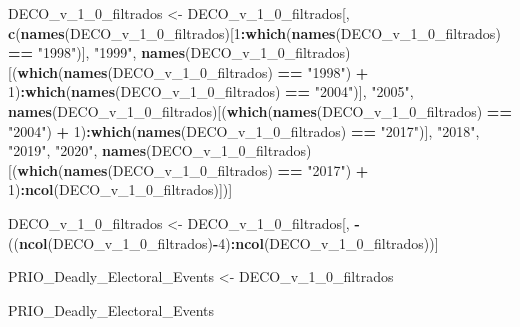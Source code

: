\documentclass[
  11pt,
]{article}
\newenvironment{Shaded}{\begin{snugshade}}{\end{snugshade}}
\newcommand{\DecValTok}[1]{\textcolor[rgb]{0.00,0.00,0.81}{#1}}
\newcommand{\FunctionTok}[1]{\textcolor[rgb]{0.13,0.29,0.53}{\textbf{#1}}}
\newcommand{\NormalTok}[1]{#1}
\newcommand{\OtherTok}[1]{\textcolor[rgb]{0.56,0.35,0.01}{#1}}
\newcommand{\SpecialCharTok}[1]{\textcolor[rgb]{0.81,0.36,0.00}{\textbf{#1}}}
\newcommand{\StringTok}[1]{\textcolor[rgb]{0.31,0.60,0.02}{#1}}
\begin{document}
\begin{Shaded}
\begin{Highlighting}[]
\NormalTok{DECO\_v\_1\_0\_filtrados }\OtherTok{\textless{}{-}}\NormalTok{ DECO\_v\_1\_0\_filtrados[, }\FunctionTok{c}\NormalTok{(}\FunctionTok{names}\NormalTok{(DECO\_v\_1\_0\_filtrados)[}\DecValTok{1}\SpecialCharTok{:}\FunctionTok{which}\NormalTok{(}\FunctionTok{names}\NormalTok{(DECO\_v\_1\_0\_filtrados) }\SpecialCharTok{==} \StringTok{"1998"}\NormalTok{)], }
                                                 \StringTok{"1999"}\NormalTok{, }
                                                 \FunctionTok{names}\NormalTok{(DECO\_v\_1\_0\_filtrados)[(}\FunctionTok{which}\NormalTok{(}\FunctionTok{names}\NormalTok{(DECO\_v\_1\_0\_filtrados) }\SpecialCharTok{==} \StringTok{"1998"}\NormalTok{) }\SpecialCharTok{+} \DecValTok{1}\NormalTok{)}\SpecialCharTok{:}\FunctionTok{which}\NormalTok{(}\FunctionTok{names}\NormalTok{(DECO\_v\_1\_0\_filtrados) }\SpecialCharTok{==} \StringTok{"2004"}\NormalTok{)], }
                                                 \StringTok{"2005"}\NormalTok{, }
                                                 \FunctionTok{names}\NormalTok{(DECO\_v\_1\_0\_filtrados)[(}\FunctionTok{which}\NormalTok{(}\FunctionTok{names}\NormalTok{(DECO\_v\_1\_0\_filtrados) }\SpecialCharTok{==} \StringTok{"2004"}\NormalTok{) }\SpecialCharTok{+} \DecValTok{1}\NormalTok{)}\SpecialCharTok{:}\FunctionTok{which}\NormalTok{(}\FunctionTok{names}\NormalTok{(DECO\_v\_1\_0\_filtrados) }\SpecialCharTok{==} \StringTok{"2017"}\NormalTok{)], }
                                                 \StringTok{"2018"}\NormalTok{, }
                                                 \StringTok{"2019"}\NormalTok{, }
                                                 \StringTok{"2020"}\NormalTok{,}
                                                 \FunctionTok{names}\NormalTok{(DECO\_v\_1\_0\_filtrados)[(}\FunctionTok{which}\NormalTok{(}\FunctionTok{names}\NormalTok{(DECO\_v\_1\_0\_filtrados) }\SpecialCharTok{==} \StringTok{"2017"}\NormalTok{) }\SpecialCharTok{+} \DecValTok{1}\NormalTok{)}\SpecialCharTok{:}\FunctionTok{ncol}\NormalTok{(DECO\_v\_1\_0\_filtrados)])]}

\NormalTok{DECO\_v\_1\_0\_filtrados }\OtherTok{\textless{}{-}}\NormalTok{ DECO\_v\_1\_0\_filtrados[, }\SpecialCharTok{{-}}\NormalTok{((}\FunctionTok{ncol}\NormalTok{(DECO\_v\_1\_0\_filtrados)}\SpecialCharTok{{-}}\DecValTok{4}\NormalTok{)}\SpecialCharTok{:}\FunctionTok{ncol}\NormalTok{(DECO\_v\_1\_0\_filtrados))]}

\NormalTok{PRIO\_Deadly\_Electoral\_Events }\OtherTok{\textless{}{-}}\NormalTok{ DECO\_v\_1\_0\_filtrados}

\NormalTok{PRIO\_Deadly\_Electoral\_Events}
\end{Highlighting}
\end{Shaded}
\end{document}
